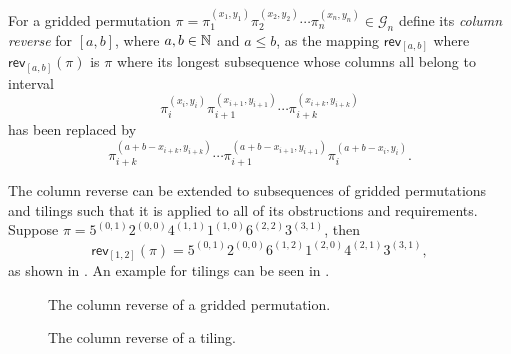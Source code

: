 \begin{definition}\label{def:rrgp}
For a gridded permutation $\pi=\pi_1^{(x_1,y_1)}\pi_2^{(x_2,y_2)}\dotsm\pi_n^{(x_n,y_n)} \in \mathcal{G}_n$ define its \emph{column reverse} for $[a,b]$, where $a,b\in\mathbb{N}$ and $a\leq b$, as the mapping $\textsf{rev}_{[a,b]}$ where $\textsf{rev}_{[a,b]}(\pi)$ is $\pi$ where its longest subsequence whose columns all belong to interval
\[
\pi_{i}^{(x_i,y_i)}\pi_{i+1}^{(x_{i+1},y_{i+1})}\dotsm\pi_{i+k}^{(x_{i+k},y_{i+k})}
\]
has been replaced by 
\[
    \pi_{i+k}^{(a+b-x_{i+k},y_{i+k})}\dotsm\pi_{i+1}^{(a+b-x_{i+1},y_{i+1})}\pi_{i}^{(a+b-x_i,y_i)}.
\]
\end{definition}

The column reverse can be extended to subsequences of gridded permutations and tilings such that it is applied to all of its obstructions and requirements. Suppose $\pi = 5^{(0,1)}2^{(0,0)}4^{(1,1)}1^{(1,0)}6^{(2,2)}3^{(3,1)}$, then 
\[
\textsf{rev}_{[1,2]}(\pi) = 5^{(0,1)}2^{(0,0)}6^{(1,2)}1^{(2,0)}4^{(2,1)}3^{(3,1)},
\]
as shown in . An example for tilings can be seen in .

\begin{figure}[htbp]
    \centering
    
    \caption{The column reverse of a gridded permutation.}
    \label{fig:gp_col_rev}
\end{figure}

\begin{figure}[htbp]
    \centering
    
    \caption{The column reverse of a tiling.}
    \label{fig:t_col_rev}
\end{figure}

